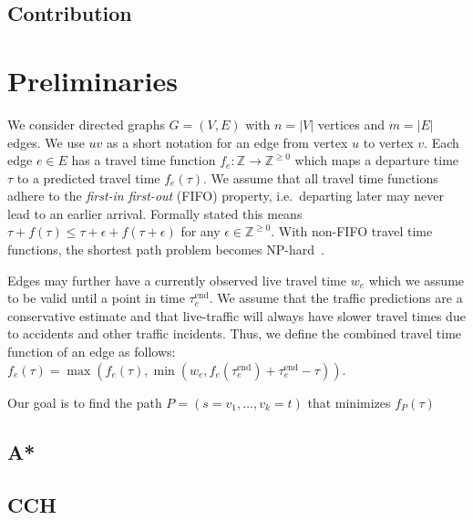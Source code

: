 \documentclass[a4paper,UKenglish,cleveref, autoref, thm-restate]{lipics-v2021}
\newcommand*{\pred}{f}
\newcommand*{\comb}{f}
\begin{document}



\subsection{Contribution}


\section{Preliminaries}
We consider directed graphs $G=(V,E)$ with $n=|V|$ vertices and $m=|E|$ edges.
We use $uv$ as a short notation for an edge from vertex $u$ to vertex $v$.
Each edge $e \in E$ has a travel time function $\pred_e : \mathbb{Z} \to \mathbb{Z}^{\geq 0}$ which maps a departure time $\tau$ to a predicted travel time $\pred_e(\tau)$.
We assume that all travel time functions adhere to the \emph{first-in first-out} (FIFO) property, i.e.\ departing later may never lead to an earlier arrival.
Formally stated this means $\tau + \pred(\tau) \leq \tau + \epsilon + \pred(\tau + \epsilon)$ for any $\epsilon \in \mathbb{Z}^{\geq 0}$.
With non-FIFO travel time functions, the shortest path problem becomes \textsf{NP}-hard~\cite{TODO}.

Edges may further have a currently observed live travel time $w_e$ which we assume to be valid until a point in time $\tau_e^{\operatorname{end}}$.
We assume that the traffic predictions are a conservative estimate and that live-traffic will always have slower travel times due to accidents and other traffic incidents.
Thus, we define the combined travel time function of an edge as follows:
$\comb_e(\tau) = \max(\pred_e(\tau), \min(w_e, \pred_e(\tau_e^{\operatorname{end}}) + \tau_e^{\operatorname{end}} - \tau ))$.

Our goal is to find the path $P = (s=v_1,\dots,v_k=t)$ that minimizes $\comb_P(\tau)$

\subsection{A*}
\subsection{CCH}
\end{document}
